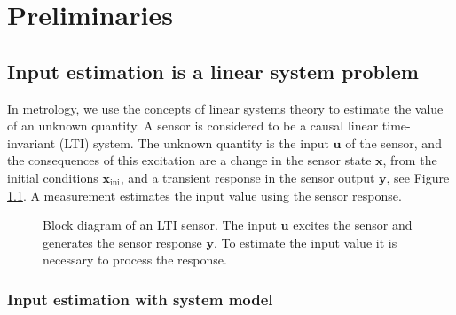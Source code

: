 \glsresetall

\chapter{Preliminaries} \label{chap:Preliminaries}

\vfill{}

\section{Input estimation is a linear system problem} 

In metrology, we use the concepts of linear systems theory to estimate the value of an unknown quantity.
A sensor is considered to be a causal linear time-invariant (LTI) system.
The unknown quantity is the input $\mathbf{u}$ of the sensor, and the consequences of this excitation are a change in the sensor state $\mathbf{x}$, from the initial conditions $\mathbf{x}_{\text{ini}}$, and a transient response in the sensor output $\mathbf{y}$, see Figure \ref{fig:sysLTI}.  
A measurement estimates the input value using the sensor response.

\begin{figure}[htb!]
\centering
{}
 \caption{Block diagram of an LTI sensor. The input $\mathbf{u}$ excites the sensor and generates the sensor response $\mathbf{y}$. To estimate the input value it is necessary to process the response.} \label{fig:sysLTI}
 \end{figure}

\subsection{Input estimation with system model}

